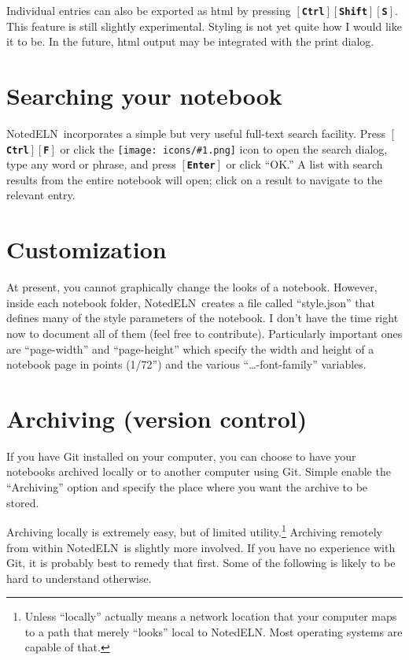 \documentclass[11pt]{report}
\def\keystroke#1{$\left[\right.\!${\tt\bfseries #1}$\!\left.\right]$}
\def\key#1{\keystroke{#1}}
\def\keycombo#1#2{\keystroke{#1}\keystroke{#2}}
\def\keycontrol#1{\keycombo{Ctrl}{#1}}
\def\controlshift#1{\keystroke{Ctrl}\keystroke{Shift}\keystroke{#1}}
\def\icon#1{\raise-2pt\hbox{\texttt{[image: icons/\#1.png]}}}
\newcommand{\NotedELN}{NotedELN} %
\begin{document}
Individual entries can also be exported as html by pressing
\controlshift{S}. This feature is still slightly experimental. Styling
is not yet quite how I would like it to be. In the future, html output
may be integrated with the print dialog.

\section{Searching your notebook}

\NotedELN\ incorporates a simple but very useful full-text search
facility. Press \keycontrol{F} or click the \icon{nav-find} icon to open the
search dialog, type any word or phrase, and press \key{Enter} or click
``OK.'' A list with search results from the entire notebook will open;
click on a result to navigate to the relevant entry.

\section{Customization}

At present, you cannot graphically change the looks of a
notebook. However, inside each notebook folder, \NotedELN\ creates a file
called ``style.json'' that defines many of the style parameters of the
notebook. I don't have the time right now to document all of them
(feel free to contribute). Particularly important ones are
``page-width'' and ``page-height'' which specify the width and height
of a notebook page in points (1/72'') and the various
``\ldots-font-family'' variables.

\section{Archiving (version control)}

If you have Git installed on your computer, you can choose to have
your notebooks archived locally or to another computer using
Git. Simple enable the ``Archiving'' option and specify the place
where you want the archive to be stored.

Archiving locally is extremely easy, but of limited
utility.\footnote{Unless ``locally'' actually means a network location
  that your computer maps to a path that merely ``looks'' local to
  \NotedELN.  Most operating systems are capable of that.} Archiving
remotely from within \NotedELN\ is slightly more involved. If you have no
experience with Git, it is probably best to remedy that first. Some of
the following is likely to be hard to understand otherwise.
\end{document}
